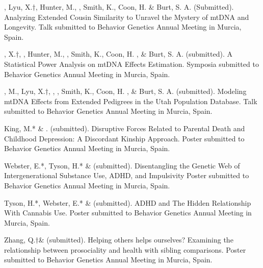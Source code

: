 
\item \meb, Lyu, X.$\dagger$, Hunter, M.,  \Joe, Smith, K., Coon, H. \& Burt, S. A. (Submitted). Analyzing Extended Cousin Similarity to Unravel the Mystery of mtDNA and Longevity. Talk submitted to Behavior Genetics Annual Meeting in Murcia, Spain.

\item \Lyu, X.$\dagger$, \meb, Hunter, M.,  \Joe, Smith, K., Coon, H. , \& Burt, S. A. (submitted). A Statistical Power Analysis on mtDNA Effects Estimation. Symposia submitted to Behavior Genetics Annual Meeting in Murcia, Spain.

\item \Hunter, M., Lyu, X.$\dagger$, \meb,  \Joe, Smith, K., Coon, H. , \& Burt, S. A. (submitted). Modeling mtDNA Effects from Extended Pedigrees in the Utah Population Database. Talk submitted to Behavior Genetics Annual Meeting in Murcia, Spain.

\item  King, M.* \& \meb. (submitted).  Disruptive Forces Related to Parental Death and Childhood Depression: A Discordant Kinship Approach. Poster submitted to Behavior Genetics Annual Meeting in Murcia, Spain.

\item Webster, E.*, Tyson, H.* \& \meb (submitted). Disentangling the Genetic Web of Intergenerational Substance Use, ADHD, and Impulsivity Poster submitted to Behavior Genetics Annual Meeting in Murcia, Spain.


\item Tyson, H.*, Webster, E.*  \& \meb (submitted). ADHD and The Hidden Relationship With Cannabis Use. Poster submitted to Behavior Genetics Annual Meeting in Murcia, Spain.

\item Zhang, Q.$\dagger$\& \meb (submitted). Helping others helps ourselves? Examining the relationship between prosociality and health with sibling comparisons. Poster submitted to Behavior Genetics Annual Meeting in Murcia, Spain.




%
%

%

%

%

%
